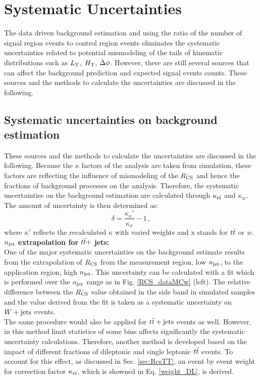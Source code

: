 \chapter{Systematic Uncertainties}
\label{chapter:systematics}
\minitoc
The data driven background estimation and using the ratio of the number of signal region events to control region events eliminates the systematic uncertainties related to potential mismodeling of the tails of kinematic distributions such as $L_{\rm T}$, $H_{\rm T}$, $\Delta \phi$. However, there are still several sources that can affect the background prediction and expected signal events counts. These sources and the methods to calculate the uncertainties are discussed in the following.
\section{Systematic uncertainties on background estimation}
These sources and the methods to calculate the uncertainties are discussed in the following.
Because the $\kappa$ factors of the analysis are taken from simulation, these factors are reflecting the influence of mismodeling of the $R_{\rm CS}$ and hence the fractions of background processes on the analysis. Therefore, the systematic uncertainties on the background estimation are calculated through $\kappa_{t\bar{t}}$ and $\kappa_{w}$.  The amount of uncertainty is then determined as:
\begin{equation}
\label{eqn:syst_unc_kappa}
\delta = \frac{\kappa _x'}{\kappa _x}-1\, ,
\end{equation}
where $\kappa'$ reflects the recalculated $\kappa$ with varied weights and x stands for $t\bar{t}$ or $w$.\\
{\boldmath $n_{\rm jet}$} \textbf{extrapolation for}  {\boldmath $t\bar{t}+$} \textbf{jets:}\\
One of the major systematic uncertainties on the background estimate results from the extrapolation of $R_{\rm CS}$ from the measurement region, low $n_{\rm jet}$, to the application region, high $n_{\rm jet}$. This uncertainty can be calculated with a fit which is performed over the $n_{\rm jet}$ range as in Fig. \ref{RCS_dataMCw} (left).  The relative difference between the $R_{\rm CS}$ value obtained in the side band in simulated samples and the value derived from the fit is taken as a systematic uncertainty on $W+\textrm{jets}$ events.\\
The same procedure would also be applied for $t\bar{t}+\textrm{jets}$ events as well. However, in this method limit statistics of some bins affects significantly the systematic uncertainty calculations. Therefore, another method is developed based on the impact of different fractions of dileptonic and single leptonic $t\bar{t}$ events. To account for this effect, as discussed in Sec. \ref{sec:RcsTT}, an event by event weight for correction factor $\kappa_{t\bar{t}}$, which is showned in Eq. \ref{weight_DL}, is derived.
